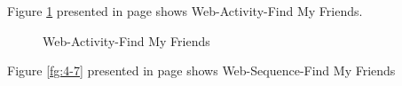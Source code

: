 \documentclass[12pt,a4paper,class,twoside,openany]{report}
\begin{document}
{Figure \ref{fg:4-6} presented in page \pageref{fg:4-6} shows Web-Activity-Find My Friends.
\begin{figure}
\begin{center}
\caption{Web-Activity-Find My Friends}
\label{fg:4-6}
\end{center}
\end{figure}
Figure \ref{fg:4-7} presented in page \pageref{fg:4-7} shows Web-Sequence-Find My Friends
\begin{figure}
\begin{center}
\fbox{
}
\end{center}
\end{figure}}
\end{document}
